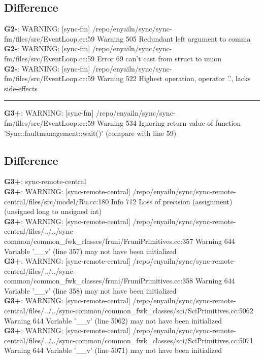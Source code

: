 \documentclass[12pt,twoside]{article}
\begin{document}
\subsection{Difference} 
\textbf{G2-}: WARNING: [sync-fm] /repo/enyailn/sync/sync-fm/files/src/EventLoop.cc:59 Warning 505 Redundant left argument to comma\\ 
\textbf{G2-}: WARNING: [sync-fm] /repo/enyailn/sync/sync-fm/files/src/EventLoop.cc:59 Error 69 can't cast from struct to union\\ 
\textbf{G2-}: WARNING: [sync-fm] /repo/enyailn/sync/sync-fm/files/src/EventLoop.cc:59 Warning 522 Highest operation, operator '.', lacks side-effects\\ 
\rule{\textwidth}{0.5pt} 
\textbf{G3+}: WARNING: [sync-fm] /repo/enyailn/sync/sync-fm/files/src/EventLoop.cc:59 Warning 534 Ignoring return value of function 'Sync::faultmanagement::wait()' (compare with line 59)\\ 
\subsection{Difference} 
  
\textbf{G3+}: sync-remote-central\\ 
\textbf{G3+}: WARNING: [sync-remote-central] /repo/enyailn/sync/sync-remote-central/files/src/model/Ru.cc:180 Info 712 Loss of precision (assignment) (unsigned long to unsigned int)\\ 
\textbf{G3+}: WARNING: [sync-remote-central] /repo/enyailn/sync/sync-remote-central/files/../../sync-common/common\_fwk\_classes/fruni/FruniPrimitives.cc:357 Warning 644 Variable '\_\_v' (line 357) may not have been initialized\\ 
\textbf{G3+}: WARNING: [sync-remote-central] /repo/enyailn/sync/sync-remote-central/files/../../sync-common/common\_fwk\_classes/fruni/FruniPrimitives.cc:358 Warning 644 Variable '\_\_v' (line 358) may not have been initialized\\ 
\textbf{G3+}: WARNING: [sync-remote-central] /repo/enyailn/sync/sync-remote-central/files/../../sync-common/common\_fwk\_classes/sci/SciPrimitives.cc:5062 Warning 644 Variable '\_\_v' (line 5062) may not have been initialized\\ 
\textbf{G3+}: WARNING: [sync-remote-central] /repo/enyailn/sync/sync-remote-central/files/../../sync-common/common\_fwk\_classes/sci/SciPrimitives.cc:5071 Warning 644 Variable '\_\_v' (line 5071) may not have been initialized\\ 
  
\end{document}
